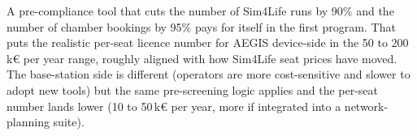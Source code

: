 \documentclass[11pt,a4paper]{article}
\begin{document}
A pre-compliance tool that cuts the number of Sim4Life runs by 90\% and the number of chamber bookings
by 95\% pays for itself in the first program. That puts the realistic per-seat licence number for AEGIS
device-side in the 50 to 200\,k\euro{} per year range, roughly aligned with how Sim4Life seat prices have
moved. The base-station side is different (operators are more cost-sensitive and slower to adopt new
tools) but the same pre-screening logic applies and the per-seat number lands lower (10 to 50\,k\euro{}
per year, more if integrated into a network-planning suite).
\end{document}
